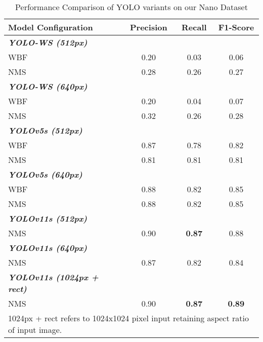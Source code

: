 \documentclass[conference]{IEEEtran}
\begin{document}
\begin{table}[htbp]
\caption{Performance Comparison of YOLO variants on our Nano Dataset}
\begin{center}
\begin{tabular}{l|ccc}
\hline
\textbf{Model Configuration} & \textbf{Precision} & \textbf{Recall} & \textbf{F1-Score}\\
\hline
\multicolumn{1}{l|}{\textit{\textbf{YOLO-WS (512px)}}} \\
\hspace{3mm}WBF & 0.20 & 0.03 & 0.06 \\
\hspace{3mm}NMS & 0.28 & 0.26 & 0.27 \\
\multicolumn{1}{l|}{\textit{\textbf{YOLO-WS (640px)}}} \\
\hspace{3mm}WBF & 0.20 & 0.04 & 0.07 \\
\hspace{3mm}NMS & 0.32 & 0.26 & 0.28 \\
\multicolumn{1}{l|}{\textit{\textbf{YOLOv5s (512px)}}} \\
\hspace{3mm}WBF & 0.87 & 0.78 & 0.82 \\
\hspace{3mm}NMS & 0.81 & 0.81 & 0.81\\
\multicolumn{1}{l|}{\textit{\textbf{YOLOv5s (640px)}}} \\
\hspace{3mm}WBF & 0.88 & 0.82 & 0.85\\
\hspace{3mm}NMS & 0.88 & 0.82 & 0.85\\
\multicolumn{1}{l|}{\textit{\textbf{YOLOv11s (512px)}}} \\
\hspace{3mm}NMS & 0.90 & \textbf{0.87} & 0.88 \\
\multicolumn{1}{l|}{\textit{\textbf{YOLOv11s (640px)}}} \\
\hspace{3mm}NMS & 0.87 & 0.82 & 0.84\\
\multicolumn{1}{l|}{\textit{\textbf{YOLOv11s (1024px + rect)}}} \\
\hspace{3mm}NMS & 0.90 & \textbf{0.87} & \textbf{0.89}\\
\hline
\multicolumn{4}{l}{\scriptsize 1024px + rect refers to 1024x1024 pixel input retaining aspect ratio of input image.}
\end{tabular}
\label{tab:nano}
\end{center}
\end{table}
\end{document}
